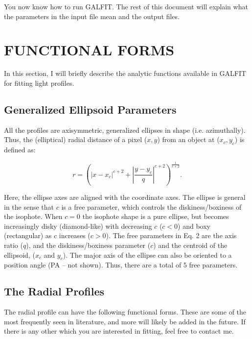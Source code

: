 \documentclass[preprint]{aastex}
\begin{document}
You now know how to run GALFIT.  The rest of this document will explain what
the parameters in the input file mean and the output files.

\bigskip


\section {FUNCTIONAL FORMS}

In this section, I will briefly describe the analytic functions available in
GALFIT for fitting light profiles.  

\subsection {Generalized Ellipsoid Parameters}

All the profiles are axisymmetric, generalized ellipses in shape (i.e.
azimuthally).  Thus, the (elliptical) radial distance of a pixel ($x,y$) from
an object at ($x_c, y_c$) is defined as:

\begin {equation}
r = \left(\left|x-x_c\right|^{c+2}+\left| \frac{y-y_c}{q}\right|^{c+2}\right)^{\frac{1}{
c+2}}.
\end{equation}

\noindent Here, the ellipse axes are aligned with the coordinate axes.  The
ellipse is general in the sense that $c$ is a free parameter, which controls
the diskiness/boxiness of the isophote.  When $c=0$ the isophote shape is a
pure ellipse, but becomes increasingly disky (diamond-like) with decreasing
$c$ ($c < 0$) and boxy (rectangular) as $c$ increases ($c>0$).  The free
parameters in Eq. 2 are the axis ratio ($q$), and the diskiness/boxiness
parameter ($c$) and the centroid of the ellipsoid, ($x_c$ and $y_c$).  The
major axis of the ellipse can also be oriented to a position angle (PA -- not
shown).  Thus, there are a total of 5 free parameters.

\subsection {The Radial Profiles}

The radial profile can have the following functional forms.  These are some of
the most frequently seen in literature, and more will likely be added in the
future.  If there is any other which you are interested in fitting, feel free
to contact me. 
\end{document}
